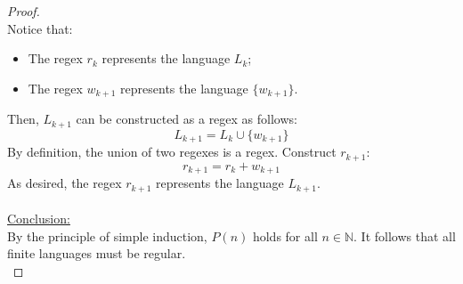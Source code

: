 \documentclass[12pt]{article}
\begin{document}
\begin{proof}
    \\
    Notice that:
    \begin{itemize}
        \item The regex $r_k$ represents the language $L_k$;
        \item The regex $w_{k + 1}$ represents the language $\{ w_{k + 1} \}$.
    \end{itemize}
    Then, $L_{k + 1}$ can be constructed as a regex as follows:
    \[
        L_{k + 1} = L_k \cup \{ w_{k + 1} \}
    \]
    By definition, the union of two regexes is a regex. Construct $r_{k + 1}$:
    \[
        r_{k + 1} = r_k + w_{k + 1}
    \]
    As desired, the regex $r_{k + 1}$ represents the language $L_{k + 1}$. \\
    \\
    \underline{Conclusion:} \\
    By the principle of simple induction, $P(n)$ holds for all $n \in \mathbb{N}$. It follows that all finite languages must be regular. \\
\end{proof}
\pagebreak
\end{document}
